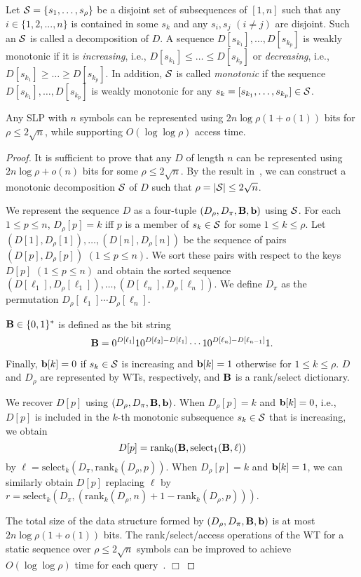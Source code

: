 \documentclass[10pt]{llncs}
\begin{document}
Let ${\cal S}=\{s_1,\ldots,s_\rho\}$ be a disjoint set of subsequences of $[1,n]$ such that 
any $i  \in \{1,2,...,n\}$ is contained in some $s_k$ and any $s_i,s_j$ $(i \neq j)$ are disjoint.
Such an ${\cal S}$ is called a decomposition of $D$.
A sequence $D[s_{k_1}],\ldots,D[s_{k_p}]$ is weakly monotonic 
if it is {\em increasing}, i.e., $D[s_{k_1}]\leq\ldots\leq D[s_{k_p}]$ or {\em decreasing}, i.e., $D[s_{k_1}]\geq\ldots\geq D[s_{k_p}]$.
In addition, ${\cal S}$ is called {\em monotonic} if the sequence $D[s_{k_1}],\ldots,D[s_{k_p}]$ is weakly monotonic 
for any $s_k=[s_{k_1},\ldots,s_{k_p}]\in {\cal S}$.

\begin{theorem}\label{th2}
Any SLP with $n$ symbols can be represented using $2n\log\rho(1 + o(1))$ bits
for $\rho\leq 2\sqrt{n}$, while supporting $O(\log\log\rho)$ access time. 
\end{theorem}
\begin{proof}
It is sufficient to prove that any $D$ of length $n$ 
can be represented using $2n\log\rho + o(n)$ bits for some $\rho\leq 2\sqrt{n}$.
By the result in~\cite{Yehuda1998},
we can construct a monotonic decomposition ${\cal S}$ of $D$ such that
$\rho = |{\cal S}| \leq 2\sqrt{n}$.

We represent the sequence $D$ as a four-tuple $(D_\rho,D_\pi,{\bf B},{\bf b})$ using ${\cal S}$.
For each $1\leq p\leq  n$, $D_\rho [p]=k$ iff 
$p$ is a member of $s_k\in {\cal S}$ for some $1\leq k\leq \rho$.
Let $(D[1],D_\rho[1]),\ldots,(D[n],D_\rho[n])$ be the sequence of pairs $(D[p],D_{\rho}[p])$ $(1 \leq p \leq n)$.
We sort these pairs with respect to the keys $D[p]$ $(1 \leq p \leq n)$ and 
obtain the sorted sequence $(D[\ell_1],D_\rho[\ell_1]),\ldots,(D[\ell_n],D_\rho[\ell_n])$. 
We define $D_\pi$ as the permutation $D_\rho[\ell_1]\cdots D_\rho[\ell_n]$. 

${\bf B}\in\{0,1\}^*$ is defined as the bit string
\[{\bf B}
=0^{D[\ell_1]}10^{D[\ell_2]-D[\ell_1]}\cdots1
0^{D[\ell_n]-D[\ell_{n-1}]}1.
\]

Finally, ${\bf b}[k]=0$ if $s_k\in {\cal S}$ is increasing and
${\bf b}[k]=1$ otherwise for $1\leq k\leq \rho$.
$D$ and $D_{\rho}$ are represented by WTs, respectively, and ${\bf B}$ is a rank/select dictionary.

We recover $D[p]$ using $(D_\rho,D_\pi,{\bf B},{\bf b})$.
When $D_\rho[p]=k$ and ${\bf b}[k]=0$, i.e., $D[p]$ is included in the 
$k$-th monotonic subsequence $s_k \in {\cal S}$ that is increasing, 
we obtain 
\[D[p] =
\mbox{rank}_0({\bf B},
\mbox{select}_1({\bf B},\ell)) 
\] 
by $\ell = \mbox{select}_k(
D_\pi,\mbox{rank}_k(D_\rho, p))$.
When $D_\rho[p]=k$ and ${\bf b}[k]=1$, we can similarly obtain $D[p]$ 
replacing $\ell$ by $r = \mbox{select}_k(D_\pi, 
(
\mbox{rank}_k(D_\rho,n)+1 - \mbox{rank}_k(D_\rho,p)
)
)$.

The total size of the data structure formed by $(D_\rho,D_\pi , {\bf B}, {\bf b})$
is at most $2n\log\rho(1+o(1))$ bits. 
The rank/select/access operations of the WT for a static sequence over $\rho\leq 2\sqrt{n}$ symbols 
can be improved to achieve $O(\log\log\rho)$ time for each query~\cite{Jeremy2010,Golynski2006}.
\hspace{\fill}$\Box$
\end{proof}
\end{document}
